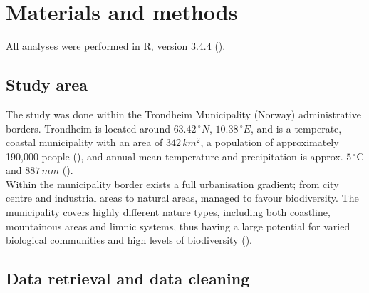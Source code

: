 \documentclass{article}
\begin{document}
\section{Materials and methods}
All analyses were performed in R, version 3.4.4 (\cite{R}).\\

\subsection{Study area}
The study was done within the Trondheim Municipality (Norway) administrative borders. Trondheim is located around $63.42\,^{\circ}N$,  $10.38\,^{\circ}E$, and is a temperate, coastal municipality with an area of $342\, km^2$, a population of approximately 190,000 people (\cite{TrondheimKommune2018}), and annual mean temperature and precipitation is approx. $5\,^{\circ}\mathrm{C}$ and $887\, mm$ (\cite{ssb2018}).\\
Within the municipality border exists a full urbanisation gradient; from city centre and industrial areas to natural areas, managed to favour biodiversity. The municipality covers highly different nature types, including both coastline, mountainous areas and limnic systems, thus having a large potential for varied biological communities and high levels of biodiversity (\cite{TrondheimKommune2018}).\\

\subsection{Data retrieval and data cleaning}
\end{document}
